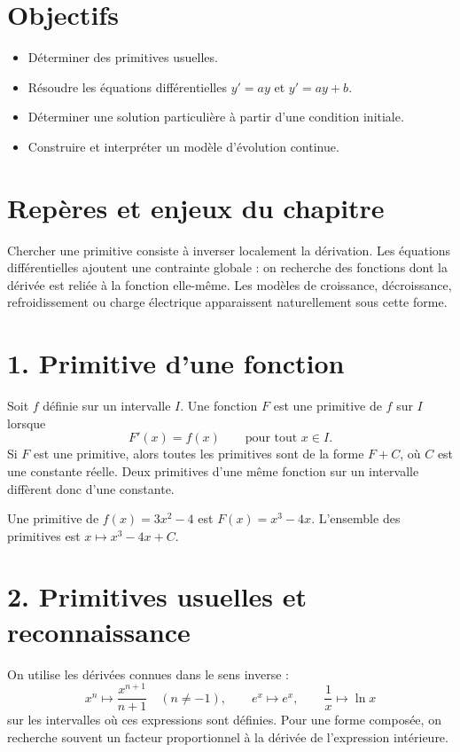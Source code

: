 
\section{Objectifs}
\begin{itemize}
\item Déterminer des primitives usuelles.
\item Résoudre les équations différentielles $y'=ay$ et $y'=ay+b$.
\item Déterminer une solution particulière à partir d’une condition initiale.
\item Construire et interpréter un modèle d’évolution continue.
\end{itemize}

\section{Repères et enjeux du chapitre}
Chercher une primitive consiste à inverser localement la dérivation. Les équations différentielles ajoutent une contrainte globale : on recherche des fonctions dont la dérivée est reliée à la fonction elle-même. Les modèles de croissance, décroissance, refroidissement ou charge électrique apparaissent naturellement sous cette forme.

\section{1. Primitive d’une fonction}
Soit $f$ définie sur un intervalle $I$. Une fonction $F$ est une primitive de $f$ sur $I$ lorsque
\[
F'(x)=f(x)\qquad\text{pour tout }x\in I.
\]
Si $F$ est une primitive, alors toutes les primitives sont de la forme $F+C$, où $C$ est une constante réelle. Deux primitives d’une même fonction sur un intervalle diffèrent donc d’une constante.

\begin{exemple}
Une primitive de $f(x)=3x^2-4$ est $F(x)=x^3-4x$. L’ensemble des primitives est $x\mapsto x^3-4x+C$.
\end{exemple}

\section{2. Primitives usuelles et reconnaissance}
On utilise les dérivées connues dans le sens inverse :
\[
x^n\longmapsto \frac{x^{n+1}}{n+1}\quad(n\neq-1),\qquad e^x\longmapsto e^x,\qquad \frac1x\longmapsto \ln x
\]
sur les intervalles où ces expressions sont définies. Pour une forme composée, on recherche souvent un facteur proportionnel à la dérivée de l’expression intérieure.

